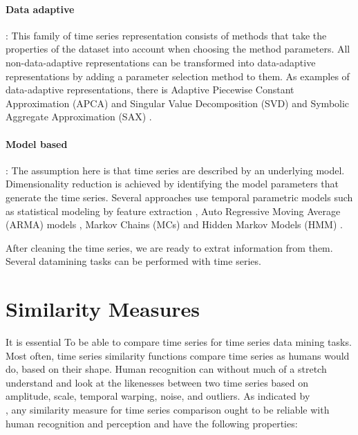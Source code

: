 \paragraph{Data adaptive}: This family of time series representation  consists of methods that take the properties of the dataset into account when choosing the method parameters. All non-data-adaptive representations can be transformed into data-adaptive representations by adding a parameter selection method to them. As examples of data-adaptive representations, there is Adaptive Piecewise Constant Approximation (APCA) \cite{keogh2001locally} and Singular Value Decomposition (SVD) \cite{de1994singular} and Symbolic Aggregate Approximation (SAX) \cite{lin2003symbolic}.

\paragraph{Model based}: The assumption here is that time series are described by an underlying model.  Dimensionality reduction is achieved by identifying the model parameters that generate the time series. Several approaches use temporal parametric models such as statistical modeling by feature extraction \cite{Esling2012}, Auto Regressive Moving Average (ARMA) models \cite{kalpakis2001distance}, Markov Chains (MCs) and Hidden Markov Models (HMM) \cite{panuccio2002hidden}.


After cleaning the time series, we are ready to extrat information from them. Several datamining tasks can be performed with time series.

\section{Similarity Measures}

It is essential To be able to compare time series  for time series data mining tasks. Most often, time series similarity functions compare time series as humans would do, based on their shape. Human recognition can without much of a stretch understand and look at the likenesses between two time series based on amplitude, scale, temporal warping, noise, and outliers. As indicated by \cite{fu2011review} \\ \cite{ralanamahatana2005mining}  \cite{Esling2012}, any similarity measure  for time series comparison ought to be reliable with human recognition and perception and have the following properties:


